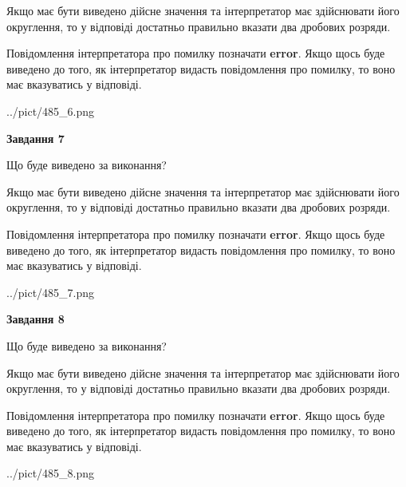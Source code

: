 \documentclass[12pt, ukrainian]{article}
\begin{document}
{\begin {Large}
Якщо має бути виведено дійсне значення та інтерпретатор має здійснювати його округлення, 
то у відповіді достатньо правильно вказати два дробових розряди.

Повідомлення інтерпретатора про помилку позначати \textbf{error}.
Якщо щось буде виведено до того, як інтерпретатор видасть повідомлення про помилку, 
то воно має вказуватись у відповіді. \par

\begin{center}
	{../pict/485_6.png}
\end{center}
\newpage

{\begin {center}\textbf{Завдання 7}\end {center}}\par
Що буде виведено за виконання? \par

Якщо має бути виведено дійсне значення та інтерпретатор має здійснювати його округлення, 
то у відповіді достатньо правильно вказати два дробових розряди.

Повідомлення інтерпретатора про помилку позначати \textbf{error}.
Якщо щось буде виведено до того, як інтерпретатор видасть повідомлення про помилку, 
то воно має вказуватись у відповіді. \par

\begin{center}
	{../pict/485_7.png}
\end{center}
\newpage

{\begin {center}\textbf{Завдання 8}\end {center}}\par
Що буде виведено за виконання? \par

Якщо має бути виведено дійсне значення та інтерпретатор має здійснювати його округлення, 
то у відповіді достатньо правильно вказати два дробових розряди.

Повідомлення інтерпретатора про помилку позначати \textbf{error}.
Якщо щось буде виведено до того, як інтерпретатор видасть повідомлення про помилку, 
то воно має вказуватись у відповіді. \par

\begin{center}
	{../pict/485_8.png}
\end{center}
\newpage


\end{Large}}
\end{document}
